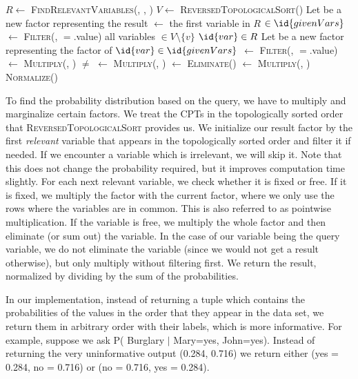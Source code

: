 \documentclass[10pt,a4paper]{article}
\begin{document}
\begin{codebox}
\li $R \gets $ \textsc{FindRelevantVariables}(, , )
\li $V \gets $ \textsc{ReversedTopologicalSort}()
\li Let  be a new factor representing the result
\li {} $\gets$ the first variable  in $R$
\li \If {} $\in \id{givenVars}$ \Then
\li	{} $\gets$ \textsc{Filter}(, $=$.value)
\End
\li \For all variables  $\in V \setminus \{v\}$ \Do 
\li	\If $\id{var} \in R$ \Then
\li	Let  be a new factor representing the factor of 
\li		\If $\id{var} \in \id{givenVars}$ \Then
\li			 {} $\gets$ \textsc{Filter}(, \id{var}$=$.value) 
\li			 {} $\gets$ \textsc{Multiply}(, )
		\End
\li	\Else \If {} $\neq$  \Then
\li		{} $\gets$ \textsc{Multiply}(, )
\li		{} $\gets$ \textsc{Eliminate}()
\li	\Else 
\li		{} $\gets$ \textsc{Multiply}(, )
	\End
	\End
\End
\li \Return \textsc{Normalize}()
\end{codebox}

To find the probability distribution based on the query, we have to multiply and marginalize certain factors. We treat the CPTs in the topologically sorted order that \textsc{ReversedTopologicalSort} provides us. We initialize our result factor by the first \emph{relevant} variable that appears in the topologically sorted order and filter it if needed. If we encounter a variable which is irrelevant, we will skip it. Note that this does not change the probability required, but it improves computation time slightly. For each next relevant variable, we check whether it is fixed or free. If it is fixed, we multiply the factor with the current factor, where we only use the rows where the variables are in common. This is also referred to as pointwise multiplication. If the variable is free, we multiply the whole factor and then eliminate (or sum out) the variable. In the case of our variable being the query variable, we do not eliminate the variable (since we would not get a result otherwise), but only multiply without filtering first. We return the result, normalized by dividing by the sum of the probabilities.

In our implementation, instead of returning a tuple which contains the probabilities of the values in the order that they appear in the data set, we return them in arbitrary order with their labels, which is more informative. For example, suppose we ask P( Burglary $|$ Mary=yes, John=yes). Instead of returning the very uninformative output (0.284, 0.716) we return either (yes = 0.284, no = 0.716) or (no = 0.716, yes = 0.284).
\end{document}
